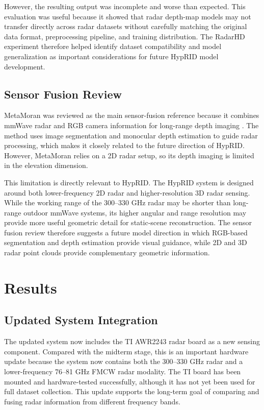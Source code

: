 \documentclass[conference]{IEEEtran}
\begin{document}
However, the resulting output was incomplete and worse than expected. This evaluation was useful because it showed that radar depth-map models may not transfer directly across radar datasets without carefully matching the original data format, preprocessing pipeline, and training distribution. The RadarHD experiment therefore helped identify dataset compatibility and model generalization as important considerations for future HypRID model development.

\subsection{Sensor Fusion Review}

MetaMoran was reviewed as the main sensor-fusion reference because it combines mmWave radar and RGB camera information for long-range depth imaging \cite{prabhakara2022metamoran}. The method uses image segmentation and monocular depth estimation to guide radar processing, which makes it closely related to the future direction of HypRID. However, MetaMoran relies on a 2D radar setup, so its depth imaging is limited in the elevation dimension.

This limitation is directly relevant to HypRID. The HypRID system is designed around both lower-frequency 2D radar and higher-resolution 3D radar sensing. While the working range of the 300--330 GHz radar may be shorter than long-range outdoor mmWave systems, its higher angular and range resolution may provide more useful geometric detail for static-scene reconstruction. The sensor fusion review therefore suggests a future model direction in which RGB-based segmentation and depth estimation provide visual guidance, while 2D and 3D radar point clouds provide complementary geometric information.

\section{Results}

\subsection{Updated System Integration}

The updated system now includes the TI AWR2243 radar board as a new sensing component. Compared with the midterm stage, this is an important hardware update because the system now contains both the 300--330 GHz radar and a lower-frequency 76--81 GHz FMCW radar modality. The TI board has been mounted and hardware-tested successfully, although it has not yet been used for full dataset collection. This update supports the long-term goal of comparing and fusing radar information from different frequency bands.
\end{document}
